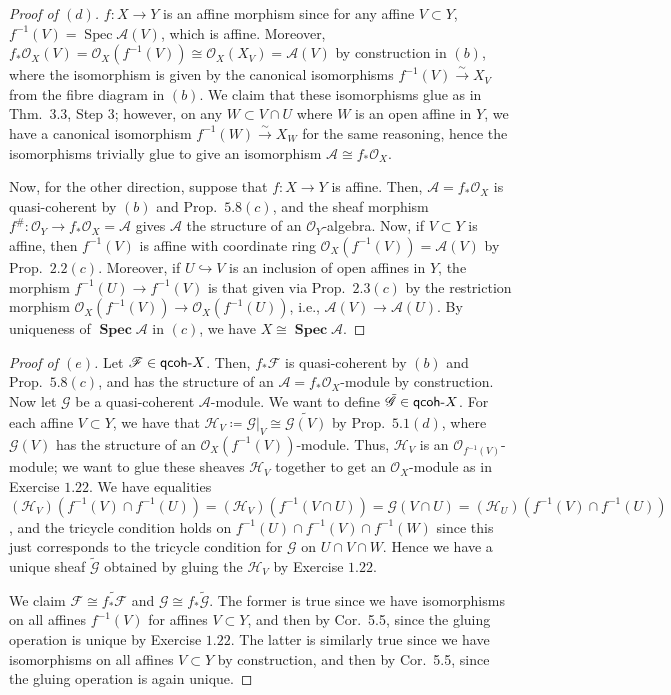\documentclass[10pt]{article}
\theoremstyle{definition}
\theoremstyle{remark}
\numberwithin{equation}{section}
\numberwithin{figure}{subsubsection}
\DeclareMathOperator{\Spec}{Spec}
\DeclareMathOperator{\SPEC}{\mathbf{Spec}}
\newcommand{\FF}{\mathscr{F}}
\newcommand{\GG}{\mathscr{G}}
\newcommand{\HH}{\mathscr{H}}
\newcommand{\OO}{\mathcal{O}}
\newcommand{\Aa}{\mathscr{A}}
\newcommand{\isoto}{\overset{\sim}{\to}}
\newcommand{\qcoh}{\mathsf{qcoh}\mathchar`-}
\begin{document}
\begin{proof}[Proof of $(d)$]
  $f\colon X \to Y$ is an affine morphism since for any affine $V \subset Y$, $f^{-1}(V) = \Spec \Aa(V)$, which is affine. Moreover, $f_*\OO_X(V) = \OO_X(f^{-1}(V)) \cong \OO_X(X_V) = \Aa(V)$ by construction in $(b)$, where the isomorphism is given by the canonical isomorphisms $f^{-1}(V) \isoto X_V$ from the fibre diagram in $(b)$. We claim that these isomorphisms glue as in Thm.~3.3, Step 3; however, on any $W \subset V \cap U$ where $W$ is an open affine in $Y$, we have a canonical isomorphism $f^{-1}(W) \isoto X_W$ for the same reasoning, hence the isomorphisms trivially glue to give an isomorphism $\Aa \cong f_*\OO_X$.
  \par Now, for the other direction, suppose that $f\colon X \to Y$ is affine. Then, $\Aa = f_*\OO_X$ is quasi-coherent by $(b)$ and Prop.~$5.8(c)$, and the sheaf morphism $f^\#\colon \OO_Y \to f_*\OO_X = \Aa$ gives $\Aa$ the structure of an $\OO_Y$-algebra. Now, if $V \subset Y$ is affine, then $f^{-1}(V)$ is affine with coordinate ring $\OO_X(f^{-1}(V)) = \Aa(V)$ by Prop.~$2.2(c)$. Moreover, if $U \hookrightarrow V$ is an inclusion of open affines in $Y$, the morphism $f^{-1}(U) \to f^{-1}(V)$ is that given via Prop.~$2.3(c)$ by the restriction morphism $\OO_X(f^{-1}(V)) \to \OO_X(f^{-1}(U))$, i.e., $\Aa(V) \to \Aa(U)$. By uniqueness of $\SPEC \Aa$ in $(c)$, we have $X \cong \SPEC \Aa$.
\end{proof}
\begin{proof}[Proof of $(e)$]
  Let $\FF\in \qcoh X$. Then, $f_*\FF$ is quasi-coherent by $(b)$ and
  Prop.~$5.8(c)$, and has the structure of an $\Aa = f_*\OO_X$-module by
  construction. Now let $\GG$ be a quasi-coherent $\Aa$-module. We want to
  define $\tilde{\GG} \in \qcoh X$. For each affine $V \subset Y$, we have that
  $\HH_V \coloneqq \GG\vert_V \cong \widetilde{\GG(V)}$ by Prop.~$5.1(d)$, where
  $\GG(V)$ has the structure of an $\OO_X(f^{-1}(V))$-module. Thus, $\HH_V$ is
  an $\OO_{f^{-1}(V)}$-module; we want to glue these sheaves $\HH_V$ together to
  get an $\OO_X$-module as in Exercise $1.22$. We have equalities
  $(\HH_V)(f^{-1}(V) \cap f^{-1}(U)) = (\HH_V)(f^{-1}(V \cap U)) = \GG(V \cap U)
  = (\HH_U)(f^{-1}(V) \cap f^{-1}(U))$, and the tricycle condition holds on
  $f^{-1}(U) \cap f^{-1}(V) \cap f^{-1}(W)$ since this just corresponds to the
  tricycle condition for $\GG$ on $U \cap V \cap W$. Hence we have a unique
  sheaf $\tilde{\GG}$ obtained by gluing the $\HH_V$ by Exercise $1.22$.
  \par We claim $\FF \cong \widetilde{f_*\FF}$ and $\GG \cong f_*\tilde{\GG}$.
  The former is true since we have isomorphisms on all affines $f^{-1}(V)$ for
  affines $V \subset Y$, and then by Cor.~5.5, since the gluing operation is
  unique by Exercise $1.22$. The latter is similarly true since we have isomorphisms on all affines $V \subset Y$ by construction, and then by Cor.~5.5, since the gluing operation is again unique.
\end{proof}
\end{document}
